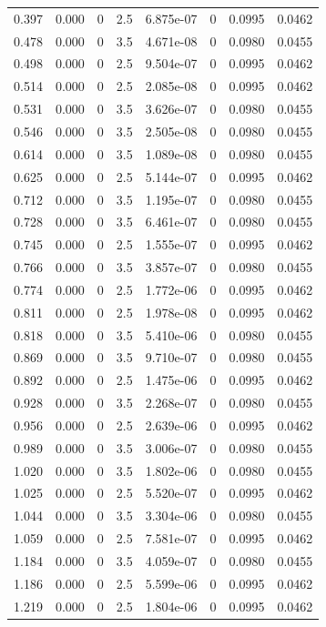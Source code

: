 \documentclass[preview]{standalone}
\begin{document}
{{\begin{tabular}{L{1.2cm}C{1.2cm} C{0.3cm}C{0.5cm} C{1.4cm}C{1.4cm} C{1.4cm}C{1.4cm}}
  0.397  &  0.000  & 0     & 2.5 &  6.875e-07  & 0  & 0.0995 &  0.0462   \\ 
  0.478  &  0.000  & 0     & 3.5 &  4.671e-08  & 0  & 0.0980 &  0.0455   \\ 
  0.498  &  0.000  & 0     & 2.5 &  9.504e-07  & 0  & 0.0995 &  0.0462   \\ 
  0.514  &  0.000  & 0     & 2.5 &  2.085e-08  & 0  & 0.0995 &  0.0462   \\ 
  0.531  &  0.000  & 0     & 3.5 &  3.626e-07  & 0  & 0.0980 &  0.0455   \\ 
  0.546  &  0.000  & 0     & 3.5 &  2.505e-08  & 0  & 0.0980 &  0.0455   \\ 
  0.614  &  0.000  & 0     & 3.5 &  1.089e-08  & 0  & 0.0980 &  0.0455   \\ 
  0.625  &  0.000  & 0     & 2.5 &  5.144e-07  & 0  & 0.0995 &  0.0462   \\ 
  0.712  &  0.000  & 0     & 3.5 &  1.195e-07  & 0  & 0.0980 &  0.0455   \\ 
  0.728  &  0.000  & 0     & 3.5 &  6.461e-07  & 0  & 0.0980 &  0.0455   \\ 
  0.745  &  0.000  & 0     & 2.5 &  1.555e-07  & 0  & 0.0995 &  0.0462   \\ 
  0.766  &  0.000  & 0     & 3.5 &  3.857e-07  & 0  & 0.0980 &  0.0455   \\ 
  0.774  &  0.000  & 0     & 2.5 &  1.772e-06  & 0  & 0.0995 &  0.0462   \\ 
  0.811  &  0.000  & 0     & 2.5 &  1.978e-08  & 0  & 0.0995 &  0.0462   \\ 
  0.818  &  0.000  & 0     & 3.5 &  5.410e-06  & 0  & 0.0980 &  0.0455   \\ 
  0.869  &  0.000  & 0     & 3.5 &  9.710e-07  & 0  & 0.0980 &  0.0455   \\ 
  0.892  &  0.000  & 0     & 2.5 &  1.475e-06  & 0  & 0.0995 &  0.0462   \\ 
  0.928  &  0.000  & 0     & 3.5 &  2.268e-07  & 0  & 0.0980 &  0.0455   \\ 
  0.956  &  0.000  & 0     & 2.5 &  2.639e-06  & 0  & 0.0995 &  0.0462   \\ 
  0.989  &  0.000  & 0     & 3.5 &  3.006e-07  & 0  & 0.0980 &  0.0455   \\ 
  1.020  &  0.000  & 0     & 3.5 &  1.802e-06  & 0  & 0.0980 &  0.0455   \\ 
  1.025  &  0.000  & 0     & 2.5 &  5.520e-07  & 0  & 0.0995 &  0.0462   \\ 
  1.044  &  0.000  & 0     & 3.5 &  3.304e-06  & 0  & 0.0980 &  0.0455   \\ 
  1.059  &  0.000  & 0     & 2.5 &  7.581e-07  & 0  & 0.0995 &  0.0462   \\ 
  1.184  &  0.000  & 0     & 3.5 &  4.059e-07  & 0  & 0.0980 &  0.0455   \\ 
  1.186  &  0.000  & 0     & 2.5 &  5.599e-06  & 0  & 0.0995 &  0.0462   \\ 
  1.219  &  0.000  & 0     & 2.5 &  1.804e-06  & 0  & 0.0995 &  0.0462   \\ 
\hline 
\end{tabular} 

}}
\end{document}
